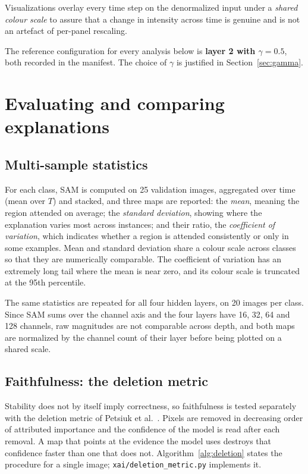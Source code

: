 Visualizations overlay every time step on the denormalized input under a
\emph{shared colour scale} to assure that a change in intensity across time is genuine
and is not an artefact of per-panel rescaling.
 
The reference configuration for every analysis below is \textbf{layer 2 with
$\gamma = 0.5$}, both recorded in the manifest. The choice of $\gamma$ is
justified in Section~\ref{sec:gamma}.
 
\section{Evaluating and comparing explanations}
\label{sec:xai-protocol}
 
\subsection{Multi-sample statistics}
 
For each class, SAM is computed on 25 validation images, aggregated
over time (mean over $T$) and stacked, and three maps are reported: the
\emph{mean}, meaning the region attended on average; the \emph{standard deviation},
showing where the explanation varies most across
instances; and their ratio, the
\emph{coefficient of variation}, which indicates whether a region is attended
consistently or only in some examples. Mean and standard deviation share a
colour scale across classes so that they are numerically comparable. The
coefficient of variation has an extremely long tail where the mean is near zero,
and its colour scale is truncated at the 95th percentile.

The same statistics are repeated for all four hidden layers, on 20 images per
class. Since SAM sums over the channel axis and the four layers have 16, 32, 64
and 128 channels, raw magnitudes are not comparable across depth, and both maps
are normalized by the channel count of their layer before being plotted on a
shared scale.
 
\subsection{Faithfulness: the deletion metric}
\label{sec:deletion-method}

Stability does not by itself imply correctness, so faithfulness is tested
separately with the
deletion metric of Petsiuk et al.~\cite{petsiuk2018rise}. Pixels are removed in
decreasing order of attributed importance and the confidence of the model is
read after each removal. A map that points at the evidence the model uses
destroys that confidence faster than one that does not.
Algorithm~\ref{alg:deletion} states the procedure for a single image;
\texttt{xai/deletion\_metric.py} implements it.
 
